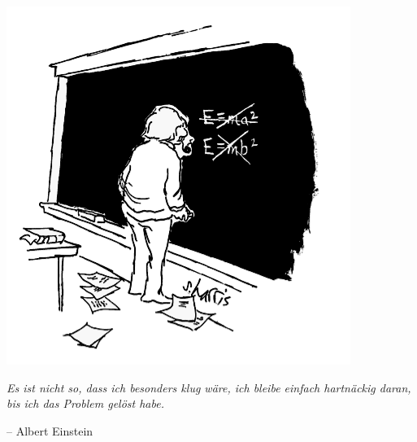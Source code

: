 \documentclass[12pt]{zettel}
\newif\ifmore\moretrue
\begin{document}
\begin{center}
  \includegraphics[scale=0.4]{einstein}

  \emph{Es ist nicht so, dass ich besonders klug wäre, ich bleibe einfach
  hartnäckig daran, \\ bis ich das Problem gelöst habe.}

  -- Albert Einstein
\end{center}

\newpage

\fi
\ifmore\repeat

\closein\quelle
\end{document}
